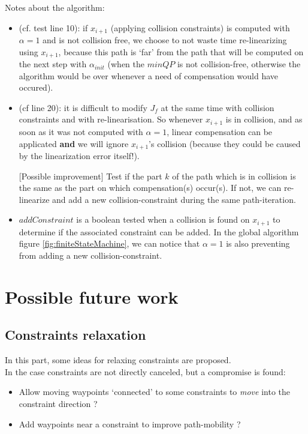 \documentclass {article}
\begin{document}
Notes about the algorithm:
\begin{itemize}
\item (cf. test line 10): if $x_{i+1}$ (applying collision constraints) is computed
with $\alpha=1$ and is not collision free, we choose to not waste time re-linearizing
 using $x_{i+1}$, because this path is `far' from the path that will be computed on the next step with $\alpha_{init}$ (when the $minQP$ is not collision-free, otherwise
 the algorithm would be over whenever a need of compensation would have occured).

\item (cf line 20): it is difficult to modify $J_f$ at the same time with
collision constraints and with re-linearisation. So whenever $x_{i+1}$ is in
collision, and as soon as it was not computed with $\alpha=1$, linear compensation can
be applicated \textbf{and} we will ignore $x_{i+1}$'s collision (because they could be caused by the linearization error itself!).

[Possible improvement] Test if the part $k$ of the path which is in collision is the same as the part on which compensation(s) occur(s). If not, we can re-linearize and add a new collision-constraint during the same path-iteration.

\item $addConstraint$ is a boolean tested when a collision is found on $x_{i+1}$
to determine if the associated constraint can be added. In the global algorithm
figure \ref{fig:finiteStateMachine}, we can notice that $\alpha=1$ is also preventing from adding a new collision-constraint.
\end{itemize}


\vspace{0.2cm}




\newpage

\section{Possible future work}

\subsection{Constraints relaxation}
In this part, some ideas for relaxing constraints are proposed.\\
In the case constraints are not directly canceled, but a compromise is found:
\begin{itemize}
\item Allow moving waypoints `connected' to some constraints to \textit{move} into the
constraint direction ?
\item Add waypoints near a constraint to improve path-mobility ?
\end{itemize}
\end{document}

